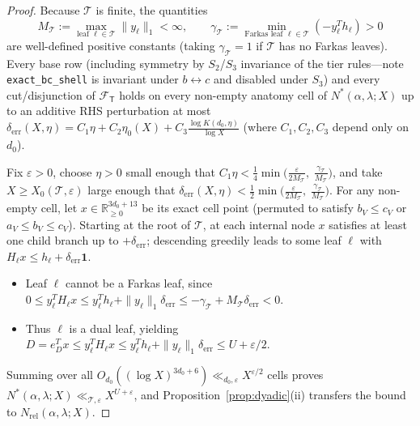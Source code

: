 \documentclass[11pt,a4paper]{amsart}
\theoremstyle{plain}
\theoremstyle{definition}
\theoremstyle{remark}
\newcommand{\R}{\mathbb{R}}
\newcommand{\eps}{\varepsilon}
\begin{document}
\begin{proof}
Because $\mathcal{T}$ is finite, the quantities
\[
  M_{\mathcal{T}} := \max_{\text{leaf } \ell \in \mathcal{T}} \|y_\ell\|_1 < \infty,
  \qquad
  \gamma_{\mathcal{T}} := \min_{\text{Farkas leaf } \ell \in \mathcal{T}} (-y_\ell^T h_\ell) > 0
\]
are well-defined positive constants (taking $\gamma_{\mathcal{T}} = 1$ if $\mathcal{T}$ has no Farkas leaves). Every base row (including symmetry by $S_2$/$S_3$ invariance of the tier rules—note \texttt{exact\_bc\_shell} is invariant under $b \leftrightarrow c$ and disabled under $S_3$) and every cut/disjunction of $\mathcal{F}_{\mathsf{T}}$ holds on every non-empty anatomy cell of $N^*(\alpha,\lambda;X)$ up to an additive RHS perturbation at most $\delta_{\mathrm{err}}(X,\eta) = C_1 \eta + C_2 \eta_0(X) + C_3 \frac{\log K(d_0,\eta)}{\log X}$ (where $C_1, C_2, C_3$ depend only on $d_0$).

Fix $\eps > 0$, choose $\eta > 0$ small enough that $C_1 \eta < \frac{1}{4}\min\bigl(\frac{\eps}{2 M_{\mathcal{T}}},\; \frac{\gamma_{\mathcal{T}}}{M_{\mathcal{T}}}\bigr)$, and take $X \ge X_0(\mathcal{T}, \eps)$ large enough that $\delta_{\mathrm{err}}(X,\eta) < \frac{1}{2}\min\bigl(\frac{\eps}{2 M_{\mathcal{T}}},\; \frac{\gamma_{\mathcal{T}}}{M_{\mathcal{T}}}\bigr)$. For any non-empty cell, let $x \in \R_{\ge 0}^{3d_0+13}$ be its exact cell point (permuted to satisfy $b_V \le c_V$ or $a_V \le b_V \le c_V$). Starting at the root of $\mathcal{T}$, at each internal node $x$ satisfies at least one child branch up to $+\delta_{\mathrm{err}}$; descending greedily leads to some leaf $\ell$ with $H_\ell x \le h_\ell + \delta_{\mathrm{err}} \mathbf{1}$.
\begin{itemize}[itemsep=1pt]
\item Leaf $\ell$ cannot be a Farkas leaf, since $0 \le y_\ell^T H_\ell x \le y_\ell^T h_\ell + \|y_\ell\|_1 \delta_{\mathrm{err}} \le -\gamma_{\mathcal{T}} + M_{\mathcal{T}} \delta_{\mathrm{err}} < 0$.
\item Thus $\ell$ is a dual leaf, yielding $D = e_D^T x \le y_\ell^T H_\ell x \le y_\ell^T h_\ell + \|y_\ell\|_1 \delta_{\mathrm{err}} \le U + \eps/2$.
\end{itemize}
Summing over all $O_{d_0}((\log X)^{3d_0+6}) \ll_{d_0,\eps} X^{\eps/2}$ cells proves $N^*(\alpha,\lambda;X) \ll_{\mathcal{T},\eps} X^{U+\eps}$, and Proposition~\ref{prop:dyadic}(ii) transfers the bound to $N_{\mathrm{rel}}(\alpha,\lambda;X)$.
\end{proof}
\end{document}
